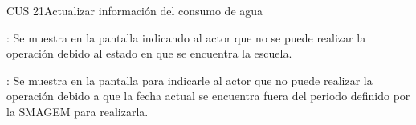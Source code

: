 \begin{UseCase}{CUS 21}{Actualizar información del consumo de agua}
{\begin{UClist}
	    \UCli  {}: Se muestra en la pantalla  indicando al actor que no se puede realizar la operación debido al estado en que se encuentra la escuela.
	    
	    \UCli {}: Se muestra en la pantalla  para indicarle al actor que no puede realizar la operación debido a que la fecha actual se encuentra fuera del periodo definido por la SMAGEM para realizarla.
	    
	\end{UClist}
    }


\end{UseCase}

